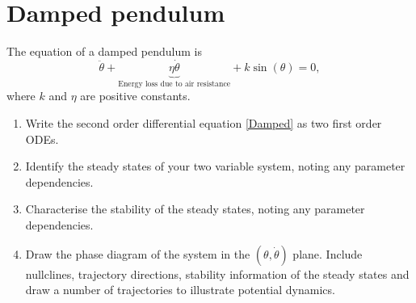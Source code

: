 \documentclass[]{article}
\newcommand{\bb}{\begin{equation}}
\newcommand{\ee}{\end{equation}}
\newcommand{\eqn}[1]{equation \eqref{#1}}
\begin{document}
\section{Damped pendulum}
The equation of a damped pendulum is
\bb
\ddot{\theta}+\underbrace{\eta \dot{\theta}}_{\textrm{Energy loss due to air resistance}}+k\sin(\theta)=0,\label{Damped}
\ee
where $k$ and $\eta$ are positive constants.
\begin{enumerate}
\item Write the second order differential \eqn{Damped} as two first order ODEs.
\item Identify the steady states of your two variable system, noting any parameter dependencies.
\item Characterise the stability of the steady states, noting any parameter dependencies.
\item Draw the phase diagram of the system in the $(\theta,\dot{\theta})$ plane. Include nullclines, trajectory directions, stability information of the steady states and draw a number of trajectories to illustrate potential dynamics.
\end{enumerate}
\end{document}
